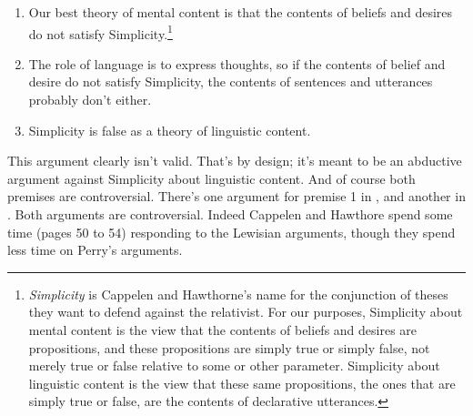 \begin{enumerate}
\item Our best theory of mental content is that the contents of beliefs and desires do not satisfy Simplicity.\footnote{\textit{Simplicity} is Cappelen and Hawthorne's name for the conjunction of theses they want to defend against the relativist. For our purposes, Simplicity about mental content is the view that the contents of beliefs and desires are propositions, and these propositions are simply true or simply false, not merely true or false relative to some or other parameter. Simplicity about linguistic content is the view that these same propositions, the ones that are simply true or false, are the contents of declarative utterances.}
\item The role of language is to express thoughts, so if the contents of belief and desire do not satisfy Simplicity, the contents of sentences and utterances probably don't either.
\item Simplicity is false as a theory of linguistic content.
\end{enumerate}

\noindent This argument clearly isn't valid. That's by design; it's meant to be an abductive argument against Simplicity about linguistic content. And of course both premises are controversial. There's one argument for premise 1 in \citet{Lewis1979b}, and another in \citet{Perry1979-PERTPO}. Both arguments are controversial. Indeed Cappelen and Hawthore spend some time (pages 50 to 54) responding to the Lewisian arguments, though they spend less time on Perry's arguments.

